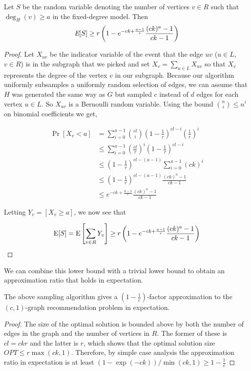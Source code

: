 

\begin{thm}\label{original_result}
Let $S$ be the
random variable denoting the number of vertices $v \in R$ such that
$\deg_{H}(v)\geq a$ in the fixed-degree model. Then
\[ \emph{\text{E}}[S] \geq r\left(1-e^{-ck+\frac{a-1}{r}}\frac{(ck)^a-1}{ck-1}\right)  \]
\end{thm}

\begin{proof}
Let $X_{uv}$ be the indicator variable of the event that the edge $uv$
($u\in L$, $v\in R$) is in the subgraph that we picked
and set $X_{v} = \sum_{u\in L} X_{uv}$ so that $X_{v}$ represents the
degree of the vertex $v$ in our subgraph. Because our algorithm
uniformly subsamples a uniformly random selection of edges, we can
assume that $H$ was generated the same way as $G$ but sampled $c$
instead of $d$ edges for each vertex $u\in L$. So $X_{uv}$ is a
Bernoulli random variable. Using the bound $\binom{n}{i}
\leq n^i$ on binomial coefficients we get,

\begin{align*}
      \Pr[X_v < a]
&=    \sum_{i=0}^{a-1} \binom{cl}{i} \left(1-\frac{1}{r}\right)^{cl-i}\left(\frac{1}{r}\right)^i \\
&\leq \sum_{i=0}^{a-1} \left(\frac{cl}{r}\right)^i\left(1-\frac{1}{r}\right)^{cl-i} \\
&\leq    \left(1-\frac{1}{r}\right)^{cl-(a-1)} \sum_{i=0}^{a-1} (ck)^i \\
&\leq \left(1-\frac{1}{r}\right)^{cl-(a-1)}\frac{(ck)^a-1}{ck-1} \\
&\leq e^{-ck+\frac{a-1}{r}} \frac{(ck)^a-1}{ck-1}
\end{align*}

Letting $Y_v = \left[X_v \geq a\right]$, we now see that

\[ \text{E}[S] = \text{E}\left[\sum_{v\in R} Y_v\right] \geq r\left(1-e^{-ck+\frac{a-1}{r}} \frac{(ck)^a-1}{ck-1}\right) \]
\end{proof}

We can combine this lower bound with a trivial lower bound to obtain an
approximation ratio that holds in expectation.

\begin{thm}
The above sampling algorithm gives a $\left(1-\frac1e\right)$-factor approximation to the $(c,1)$-graph recommendation problem in expectation.
\end{thm}
\begin{proof}
The size of the optimal solution is bounded above by both the number
of edges in the graph and the number of vertices in $R$. The former of
these is $cl=ckr$ and the latter is $r$, which shows that the optimal solution size
$OPT \leq
r\max(ck,1)$. Therefore, by simple case analysis the approximation ratio
in expectation is at least
$ ({1-\exp(-ck)})/\min(ck,1) \geq 1-\frac{1}{e} $
\end{proof}


